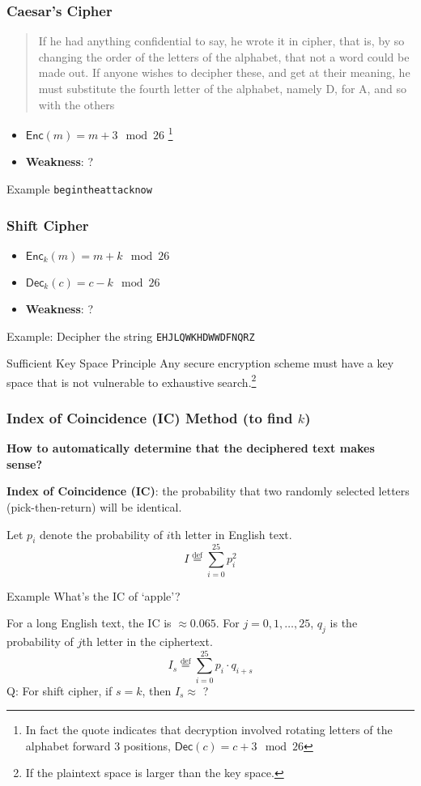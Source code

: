 \begin{frame}[fragile]\frametitle{Caesar's Cipher}
\begin{quote}
If he had anything confidential to say, he wrote it in cipher, that is, by so changing the order of the letters of the alphabet, that not a word could be made out. If anyone wishes to \alert{decipher} these, and get at their meaning, he must \alert{substitute the fourth letter of the alphabet, namely D, for A}, and so with the others

\end{quote}
\begin{itemize}
	\item $\mathsf{Enc}(m)=m+3\mod 26$ \footnote{In fact the quote indicates that decryption involved rotating letters of the alphabet forward 3 positions, $\mathsf{Dec}(c)=c+3\mod 26$}
	\item \textbf{Weakness}: ? %
\end{itemize}
\begin{exampleblock}{Example}
\verb|begintheattacknow|
\end{exampleblock}
\end{frame}
\begin{frame}[fragile]\frametitle{Shift Cipher}
\begin{itemize}
\item $\mathsf{Enc}_k(m)=m+k\mod 26$
\item $\mathsf{Dec}_k(c)=c-k\mod 26$
\item \textbf{Weakness}: ? %
\end{itemize}
\begin{exampleblock}{Example: Decipher the string}	
\verb|EHJLQWKHDWWDFNQRZ|
\end{exampleblock}
\begin{alertblock}{Sufficient Key Space Principle}
Any secure encryption scheme must have a key space that is not vulnerable to exhaustive search.\footnote{If the plaintext space is larger than the key space.}
\end{alertblock}
\end{frame}
\begin{frame}\frametitle{Index of Coincidence (IC) Method (to find $k$)}
\textbf{How to automatically determine that the deciphered text makes sense?}

\textbf{Index of Coincidence (IC)}: the probability that two randomly selected letters (pick-then-return) will be identical.

Let $p_i$ denote the probability of $i$th letter in English text.
\[I \overset{\text{def}}{=}\sum_{i=0}^{25} p_i^2 \]
\begin{exampleblock}{Example}
What's the IC of `apple'?
\end{exampleblock}

For a long English text, the IC is $\approx 0.065$.
For $j = 0, 1, \dotsc , 25$, $q_j$ is the probability of $j$th letter in the ciphertext.
\[I_s \overset{\text{def}}{=}\sum_{i=0}^{25} p_i \cdot q_{i+s}\]
\alert{Q: For shift cipher, if $s = k$, then $I_s \approx$ ?}
\end{frame}

